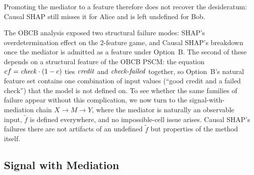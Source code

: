 Promoting the mediator to a feature therefore does not recover the desideratum:
Causal SHAP still misses it for Alice and is left undefined for Bob.

\medskip\noindent
The OBCB analysis exposed two structural failure modes: SHAP's
overdetermination effect on the 2-feature game, and Causal SHAP's breakdown
once the mediator is admitted as a feature under Option~B. The second of
these depends on a structural feature of the OBCB PSCM: the equation
$cf = \varname{check}\cdot(1 - c)$ ties $\varname{credit}$ and
$\varname{check\text{-}failed}$ together, so Option~B's natural feature set
contains one combination of input values (``good credit and a failed
check'') that the model is not defined on. To see whether the same families
of failure appear without this complication, we now turn to the
signal-with-mediation chain $X \to M \to Y$, where the mediator is naturally
an observable input, $\tilde f$ is defined everywhere, and no impossible-cell
issue arises. Causal SHAP's failures there are not artifacts of an undefined
$\tilde f$ but properties of the method itself.


\subsection{Signal with Mediation}\label{sec:signal}

